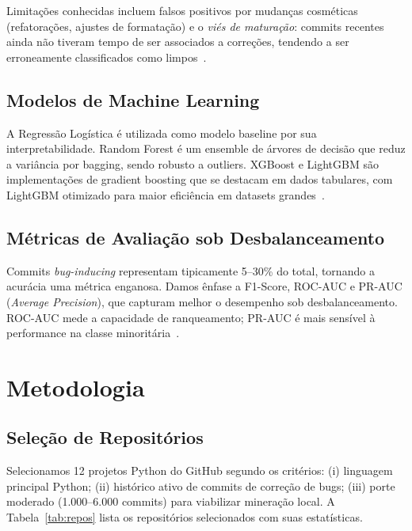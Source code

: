 \documentclass[12pt]{article}
\begin{document}
Limitações conhecidas incluem falsos positivos por mudanças cosméticas (refatorações,
ajustes de formatação) e o \textit{viés de maturação}: commits recentes ainda não
tiveram tempo de ser associados a correções, tendendo a ser erroneamente classificados
como limpos~\cite{dacosta2017}.

\subsection{Modelos de Machine Learning}

A Regressão Logística é utilizada como modelo baseline por sua interpretabilidade.
Random Forest é um ensemble de árvores de decisão que reduz a variância por
bagging, sendo robusto a outliers. XGBoost e LightGBM são implementações de
gradient boosting que se destacam em dados tabulares, com LightGBM otimizado
para maior eficiência em datasets grandes~\cite{xgboost2016,lightgbm2017}.

\subsection{Métricas de Avaliação sob Desbalanceamento}

Commits \textit{bug-inducing} representam tipicamente 5--30\% do total, tornando
a acurácia uma métrica enganosa. Damos ênfase a F1-Score, ROC-AUC e PR-AUC
(\textit{Average Precision}), que capturam melhor o desempenho sob desbalanceamento.
ROC-AUC mede a capacidade de ranqueamento; PR-AUC é mais sensível à performance
na classe minoritária~\cite{sklearn2011}.

\section{Metodologia}
\label{sec:metodologia}

\subsection{Seleção de Repositórios}

Selecionamos 12 projetos Python do GitHub segundo os critérios: (i) linguagem
principal Python; (ii) histórico ativo de commits de correção de bugs; (iii) porte
moderado (1.000--6.000 commits) para viabilizar mineração local.
A Tabela~\ref{tab:repos} lista os repositórios selecionados com suas estatísticas.
\end{document}
